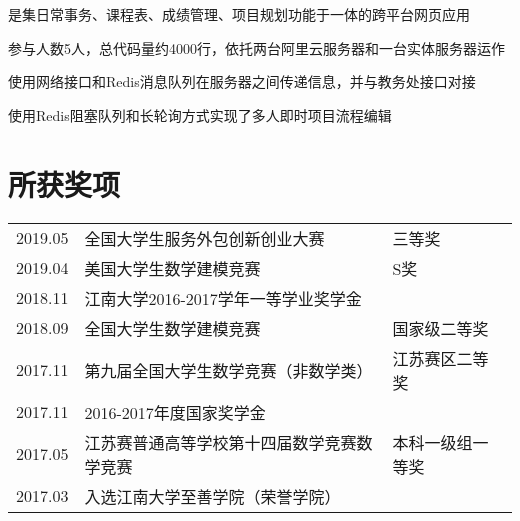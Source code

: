 \documentclass[]{deedy-resume-openfont}
\begin{document}
\begin{minipage}[t]{0.73\textwidth}
	\begin{tightemize}
		\item 是集日常事务、课程表、成绩管理、项目规划功能于一体的跨平台网页应用
		\item 参与人数5人，总代码量约4000行，依托两台阿里云服务器和一台实体服务器运作
		\item 使用网络接口和Redis消息队列在服务器之间传递信息，并与教务处接口对接
		\item 使用Redis阻塞队列和长轮询方式实现了多人即时项目流程编辑
	\end{tightemize}
	\sectionsep


	\section{所获奖项}
    \begin{tabular}{lll}
        2019.05 & 全国大学生服务外包创新创业大赛 & 三等奖 \\
        2019.04 & 美国大学生数学建模竞赛 & S奖 \\
        2018.11 & 江南大学2016-2017学年一等学业奖学金 &  \\
        2018.09 & 全国大学生数学建模竞赛 & 国家级二等奖 \\
        2017.11 & 第九届全国大学生数学竞赛（非数学类） & 江苏赛区二等奖 \\
        2017.11 & 2016-2017年度国家奖学金 & \\
        2017.05 & 江苏赛普通高等学校第十四届数学竞赛数学竞赛 & 本科一级组一等奖\\
        2017.03 & 入选江南大学至善学院（荣誉学院）& \\
	\end{tabular}
\end{minipage}
\end{document}
